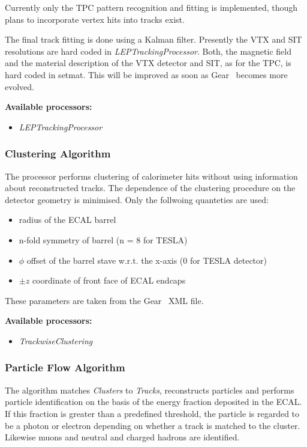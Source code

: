 Currently only the TPC pattern recognition and fitting is implemented, though 
plans to incorporate vertex hits into tracks exist.

The final track fitting is done using a Kalman filter. Presently
the VTX and SIT resolutions are hard coded in {\em LEPTrackingProcessor}. 
Both, 
the magnetic field and the material description of
the VTX detector and SIT, as for the TPC, is hard coded in setmat. 
This will be improved as soon as Gear~\cite{ref_gear} becomes more evolved.

{\bf Available processors:} 
\begin{itemize}
\item {\em LEPTrackingProcessor}
\end{itemize}

\subsubsection{Clustering Algorithm}

The processor performs clustering of calorimeter hits without
using information about reconstructed tracks. 
The dependence of the clustering procedure on the detector
geometry is minimised. Only the follwoing quanteties are used: 
\begin{itemize}
\item radius of the ECAL barrel 
\item n-fold symmetry of barrel (n = 8 for TESLA)
\item $\phi$ offset of the barrel stave w.r.t. the x-axis 
      (0 for TESLA detector) 
\item $\pm z$ coordinate of front face of ECAL endcaps 
\end{itemize}
These parameters are taken from the Gear~\cite{ref_gear} XML file.

{\bf Available processors:} 
\begin{itemize}
\item {\em TrackwiseClustering}
\end{itemize}

\subsubsection{Particle Flow Algorithm}

The algorithm matches {\em Clusters} to {\em Tracks}, reconstructs particles 
and performs
particle identification on the basis of the energy fraction deposited 
in the ECAL. If this fraction is greater than a predefined threshold, 
the particle is regarded to be a photon or electron depending on 
whether a track is matched to the cluster.
Likewise muons and neutral and charged hadrons are identified. 

